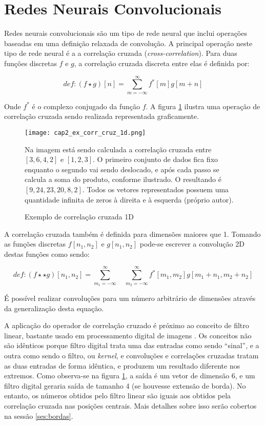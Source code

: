 \section{Redes Neurais Convolucionais} \label{sec:rnc}
Redes neurais convolucionais são um tipo de rede neural que inclui operações
baseadas em uma definição relaxada de convolução. A principal operação
neste tipo de rede neural é a a correlação cruzada (\emph{cross-correlation}).
Para duas funções discretas $f$ e $g$, a correlação cruzada discreta entre
elas é definida por:

\begin{equation}
	def: (f \star g)[n] = \sum_{m=-\infty}^{\infty} f^*[m]g[m+n]
\end{equation}

Onde $f^*$ é o complexo conjugado da função $f$. A figura
\ref{fig:cap2_ex_corr_cruz_1d} ilustra uma operação de correlação cruzada sendo
realizada representada graficamente.

\begin{figure}[!htb]
	\centering
	\texttt{[image: cap2\_ex\_corr\_cruz\_1d.png]}
	\caption{Exemplo de correlação cruzada 1D}
	\label{fig:cap2_ex_corr_cruz_1d}
	Na imagem está sendo calculada a correlação cruzada entre $[3,6,4,2]$ e
	$[1,2,3]$. O primeiro conjunto de dados fica fixo enquanto o segundo vai
	sendo deslocado, e após cada passo se calcula a soma do produto, conforme
	ilustrado. O resultando é $[9,24,23,20,8,2]$. Todos os vetores
	representados possuem uma quantidade infinita de zeros à direita e à
	esquerda (próprio autor).
\end{figure}

A correlação cruzada também é definida para dimensões maiores que 1.
Tomando as funções discretas $f[n_1,n_2]$ e $g[n_1,n_2]$ pode-se 
escrever a convolução 2D destas funções como sendo:

\begin{equation}
	def: (f \star\star g)[n_1,n_2] =
		\sum_{m_1=-\infty}^{\infty} \quad
		\sum_{m_2=-\infty}^{\infty}
		f^*[m_1,m_2]g[m_1+n_1,m_2+n_2]
\end{equation}

É possível realizar convoluções para um número arbitrário de dimensões através
da generalização desta equação.

A aplicação do operador de correlação cruzado é próximo ao conceito de filtro
linear, bastante usado em processamento digital de imagens
\cite{gonzalezwoods200708}. Os conceitos não
são idênticos porque filtro digital trata uma das entradas como sendo
``sinal'',
e a outra como sendo o filtro, ou \emph{kernel}, e convoluções e correlações
cruzadas tratam as duas entradas de forma idêntica, e produzem um resultado
diferente nos extremos. Como observa-se na figura
\ref{fig:cap2_ex_corr_cruz_1d}, a saída é um vetor de dimensão 6, e um filtro
digital geraria saída de tamanho 4 (se houvesse extensão de borda).
No entanto, os números obtidos pelo filtro linear são iguais aos obtidos pela
correlação cruzada nas posições centrais. Mais detalhes sobre isso
serão cobertos na sessão \ref{ses:bordas}.

